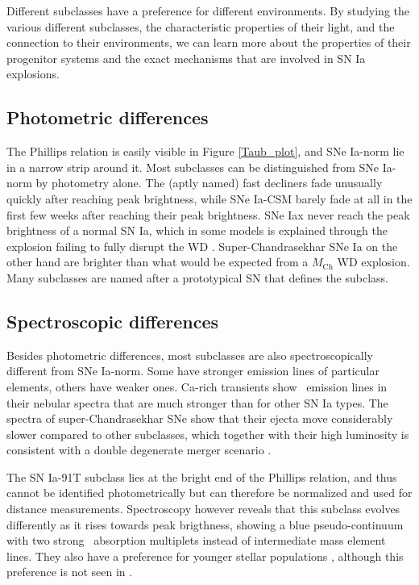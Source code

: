 \documentclass[a4paper,oneside,12pt, class=Latex/Classes/PhDthesisPSnPDF, crop=false]{standalone}
\begin{document}
Different subclasses have a preference for different environments. By studying the various different subclasses, the characteristic properties of their light, and the connection to their environments, we can learn more about the properties of their progenitor systems and the exact mechanisms that are involved in SN Ia explosions.


\subsection{Photometric differences}
The Phillips relation is easily visible in Figure \ref{Taub_plot}, and SNe Ia-norm lie in a narrow strip around it. Most subclasses can be distinguished from SNe Ia-norm by photometry alone. The (aptly named) fast decliners fade unusually quickly after reaching peak brightness, while SNe Ia-CSM barely fade at all in the first few weeks after reaching their peak brightness. SNe Iax never reach the peak brightness of a normal SN Ia, which in some models is explained through the explosion failing to fully disrupt the WD \citep{Iax_model_1, Iax_model_2}. Super-Chandrasekhar SNe Ia on the other hand are brighter than what would be expected from a $M_\text{Ch}$ WD explosion. Many subclasses are named after a prototypical SN that defines the subclass.


\subsection{Spectroscopic differences}
Besides photometric differences, most subclasses are also spectroscopically different from SNe Ia-norm. Some have stronger emission lines of particular elements, others have weaker ones. Ca-rich transients \citep[e.g.][]{Ca-rich_2010, Ca_rich_2012, Ca-rich_rate} show \CaII\ emission lines in their nebular spectra that are much stronger than for other SN Ia types. The spectra of super-Chandrasekhar SNe show that their ejecta move considerably slower compared to other subclasses, which together with their high luminosity is consistent with a double degenerate merger scenario \citep{2003fg_SuperCh, 06gz_SuperCh, 09dc_SuperCh}.

The SN Ia-91T subclass lies at the bright end of the Phillips relation, and thus cannot be identified photometrically but can therefore be normalized and used for distance measurements. Spectroscopy however reveals that this subclass evolves differently as it rises towards peak brigthness, showing a blue pseudo-continuum with two strong \FeIII\ absorption multiplets instead of intermediate mass element lines. They also have a preference for younger stellar populations \citep{Filippenko_91t, 91T}, although this preference is not seen in \citet{DR2_diversity}.
\end{document}
